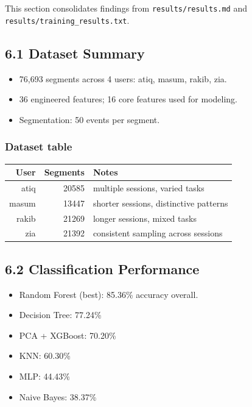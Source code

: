 \documentclass[
  11pt,
  a4paper,
]{article}
\providecommand{\tightlist}{%
  \setlength{\itemsep}{0pt}\setlength{\parskip}{0pt}}
\begin{document}
\newpage

This section consolidates findings from \texttt{results/results.md} and
\texttt{results/training\_results.txt}.

\subsection{6.1 Dataset Summary}\label{dataset-summary}

\begin{itemize}
\tightlist
\item
  76,693 segments across 4 users: atiq, masum, rakib, zia.
\item
  36 engineered features; 16 core features used for modeling.
\item
  Segmentation: 50 events per segment.
\end{itemize}

\subsubsection{Dataset table}\label{dataset-table}

\begin{longtable}[]{@{}rrl@{}}
\toprule\noalign{}
User & Segments & Notes \\
\midrule\noalign{}
\endhead
\bottomrule\noalign{}
\endlastfoot
atiq & 20585 & multiple sessions, varied tasks \\
masum & 13447 & shorter sessions, distinctive patterns \\
rakib & 21269 & longer sessions, mixed tasks \\
zia & 21392 & consistent sampling across sessions \\
\end{longtable}

\subsection{6.2 Classification
Performance}\label{classification-performance}

\begin{itemize}
\tightlist
\item
  Random Forest (best): 85.36\% accuracy overall.
\item
  Decision Tree: 77.24\%
\item
  PCA + XGBoost: 70.20\%
\item
  KNN: 60.30\%
\item
  MLP: 44.43\%
\item
  Naive Bayes: 38.37\%
\end{itemize}
\end{document}
